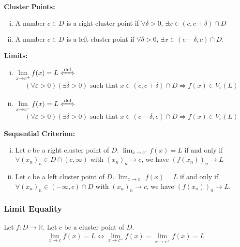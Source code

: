 \documentclass[10pt]{extarticle}
\newcommand{\R}{\mathbb{R}}
\begin{document}
    \textbf{Cluster Points:}
    \begin{enumerate}[(i)]
      \item A number $c\in D$ is a right cluster point if $\forall \delta > 0$, $\exists x\in (c,c+\delta) \cap D$
      \item A number $c\in D$ is a left cluster point if $\forall \delta > 0$, $\exists x\in (c-\delta,c) \cap D$.
    \end{enumerate}
    \textbf{Limits:}
    \begin{enumerate}[(i)]
      \item $\displaystyle \lim_{x\rightarrow c^{+}} f(x) = L \xLeftrightarrow{\text{def}}$
        \begin{align*}
          (\forall \varepsilon > 0)(\exists \delta > 0) \text{ such that } x\in (c,c+\delta)\cap D \Rightarrow f(x)\in V_{\varepsilon}(L)
        \end{align*}
      \item $\displaystyle \lim_{x\rightarrow c^{-}} f(x) = L \xLeftrightarrow{\text{def}}$
        \begin{align*}
          (\forall \varepsilon > 0)(\exists \delta > 0) \text{ such that } x\in (c-\delta,c) \cap D \Rightarrow f(x)\in V_{\varepsilon}(L)
        \end{align*}
    \end{enumerate}
    \textbf{Sequential Criterion:}
    \begin{enumerate}[(i)]
      \item Let $c$ be a right cluster point of $D$. $\lim_{x\rightarrow c^{+}} f(x) = L$ if and only if $\forall (x_n)_n \in D\cap (c,\infty)$ with $(x_n)_n \rightarrow c$, we have $(f(x_n))_n \rightarrow L$
      \item Let $c$ be a left cluster point of $D$. $\lim_{x\rightarrow c^{-}} f(x) = L$ if and only if $\forall (x_n)_n \in (-\infty,c) \cap D$ with $(x_n)_n \rightarrow c$, we have $(f(x_n))_n \rightarrow L$.
    \end{enumerate}
    \subsubsection{Limit Equality}%
    Let $f:D\rightarrow \R$. Let $c$ be a cluster point of $D$.
    \begin{align*}
      \lim_{x\rightarrow c}f(x) = L \Leftrightarrow \lim_{x\rightarrow c^{-}}f(x) = \lim_{x\rightarrow c^{+}}f(x) = L
    \end{align*}
\end{document}
